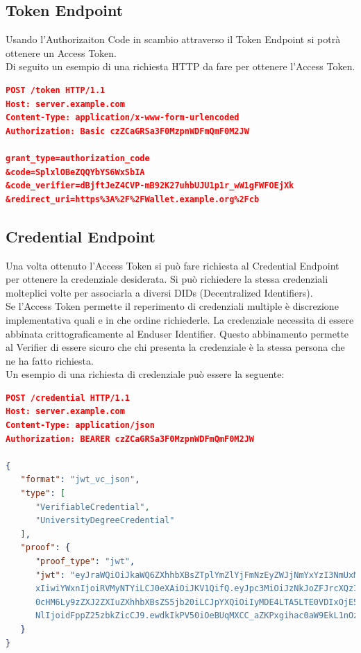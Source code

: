 \subsection{Token Endpoint}
Usando l'Authorizaiton Code in scambio attraverso il Token Endpoint si potrà ottenere un Access Token.\\
Di seguito un esempio di una richiesta HTTP da fare per ottenere l'Access Token.
\begin{lstlisting}[language=json,firstnumber=1]
POST /token HTTP/1.1
Host: server.example.com
Content-Type: application/x-www-form-urlencoded
Authorization: Basic czZCaGRSa3F0MzpnWDFmQmF0M2JW

grant_type=authorization_code
&code=SplxlOBeZQQYbYS6WxSbIA
&code_verifier=dBjftJeZ4CVP-mB92K27uhbUJU1p1r_wW1gFWFOEjXk
&redirect_uri=https%3A%2F%2FWallet.example.org%2Fcb
\end{lstlisting}

\subsection{Credential Endpoint}
Una volta ottenuto l'Access Token si può fare richiesta al Credential Endpoint per ottenere la credenziale desiderata.
Si può richiedere la stessa credenziali molteplici volte per associarla a diversi DIDs (Decentralized Identifiers).
\\Se l'Access Token permette il reperimento di credenziali multiple è discrezione implementativa quali e in che ordine richiederle.
La credenziale necessita di essere abbinata crittograficamente al Enduser Identifier.
Questo abbinamento permette al Verifier di essere sicuro che chi presenta la credenziale è la stessa persona che ne ha fatto richiesta.
\\Un esempio di una richiesta di credenziale può essere la seguente:
\begin{lstlisting}[language=json,firstnumber=1]
POST /credential HTTP/1.1
Host: server.example.com
Content-Type: application/json
Authorization: BEARER czZCaGRSa3F0MzpnWDFmQmF0M2JW

{
   "format": "jwt_vc_json",
   "type": [
      "VerifiableCredential",
      "UniversityDegreeCredential"
   ],
   "proof": {
      "proof_type": "jwt",
      "jwt": "eyJraWQiOiJkaWQ6ZXhhbXBsZTplYmZlYjFmNzEyZWJjNmYxYzI3NmUxMmVjMjEva2V5cy8
      xIiwiYWxnIjoiRVMyNTYiLCJ0eXAiOiJKV1QifQ.eyJpc3MiOiJzNkJoZFJrcXQzIiwiYXVkIjoiaHR
      0cHM6Ly9zZXJ2ZXIuZXhhbXBsZS5jb20iLCJpYXQiOiIyMDE4LTA5LTE0VDIxOjE5OjEwWiIsIm5vbm
      NlIjoidFppZ25zbkZicCJ9.ewdkIkPV50iOeBUqMXCC_aZKPxgihac0aW9EkL1nOzM"
   }
}
\end{lstlisting}

